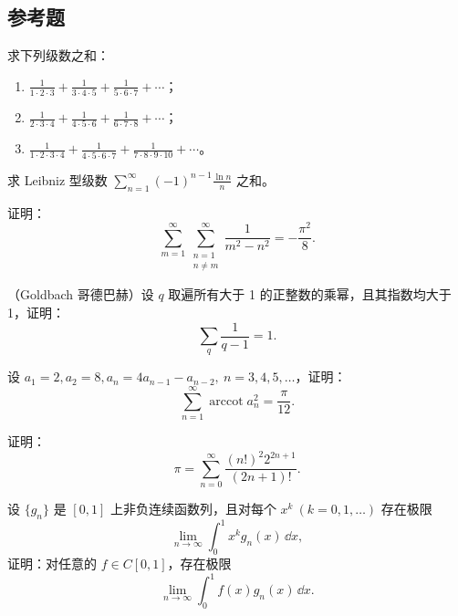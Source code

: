 \subsection{参考题}

\begin{xreferenceproblem}[1]
求下列级数之和：
\begin{enumerate}[label=(\arabic*)]
\item $\displaystyle\frac1{1\cdot2\cdot3}+\frac1{3\cdot4\cdot5}+\frac1{5\cdot6\cdot7}+\cdots$；
\item $\displaystyle\frac1{2\cdot3\cdot4}+\frac1{4\cdot5\cdot6}+\frac1{6\cdot7\cdot8}+\cdots$；
\item $\displaystyle\frac1{1\cdot2\cdot3\cdot4}+\frac1{4\cdot5\cdot6\cdot7}+\frac1{7\cdot8\cdot9\cdot10}+\cdots$。
\end{enumerate}
\end{xreferenceproblem}

\begin{xreferenceproblem}[2]
求 Leibniz 型级数 $\displaystyle\sum_{n=1}^{\infty}(-1)^{n-1}\frac{\ln n}{n}$ 之和。
\end{xreferenceproblem}

\begin{xreferenceproblem}[3]
证明：
\[
  \sum_{m=1}^{\infty}\sum_{\substack{n=1\\n\ne m}}^{\infty}\frac1{m^2-n^2}=-\frac{\pi^2}{8}.
\]
\end{xreferenceproblem}

\begin{xreferenceproblem}[4]
（Goldbach 哥德巴赫）设 $q$ 取遍所有大于 1 的正整数的乘幂，且其指数均大于 1，证明：
\[
  \sum_q\frac1{q-1}=1.
\]
\end{xreferenceproblem}

\begin{xreferenceproblem}[5]
设 $a_1=2,a_2=8,a_n=4a_{n-1}-a_{n-2},\ n=3,4,5,\ldots$，证明：
\[
  \sum_{n=1}^{\infty}\operatorname{arccot}a_n^2=\frac\pi{12}.
\]
\end{xreferenceproblem}

\begin{xreferenceproblem}[6]
证明：
\[
  \pi=\sum_{n=0}^{\infty}\frac{(n!)^2 2^{2n+1}}{(2n+1)!}.
\]
\end{xreferenceproblem}

\begin{xreferenceproblem}[7]
设 $\{g_n\}$ 是 $[0,1]$ 上非负连续函数列，且对每个 $x^k\ (k=0,1,\ldots)$ 存在极限
\[
  \lim_{n\to\infty}\int_0^1x^kg_n(x)\,\dd x,
\]
证明：对任意的 $f\in C[0,1]$，存在极限
\[
  \lim_{n\to\infty}\int_0^1f(x)g_n(x)\,\dd x.
\]
\end{xreferenceproblem}

